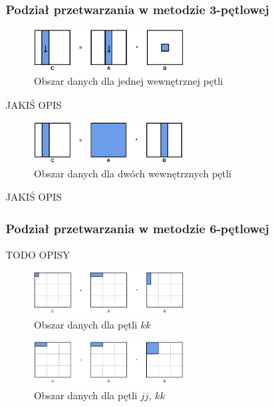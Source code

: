 \documentclass[10pt,a4paper]{article}
\begin{document}
\newpage

\subsubsection{Podział przetwarzania w metodzie 3-pętlowej}
\begin{figure}[h]
	\centering
	\includegraphics[width=0.5\textwidth]{3loops1.png}
	\caption{Obszar danych dla jednej wewnętrznej pętli}
\end{figure}

JAKIŚ OPIS

\begin{figure}[h]
	\centering
	\includegraphics[width=0.5\textwidth]{3loops2.png}
	\caption{Obszar danych dla dwóch wewnętrznych pętli}
\end{figure}
JAKIŚ OPIS

\newpage

\subsubsection{Podział przetwarzania w metodzie 6-pętlowej}
TODO OPISY

\begin{figure}[h]
	\centering
	\includegraphics[width=0.5\textwidth]{6loops1.png}
	\caption{Obszar danych dla pętli $kk$}
\end{figure}

\begin{figure}[h]
	\centering
	\includegraphics[width=0.5\textwidth]{6loops2.png}
	\caption{Obszar danych dla pętli $jj$, $kk$}
\end{figure}
\end{document}

